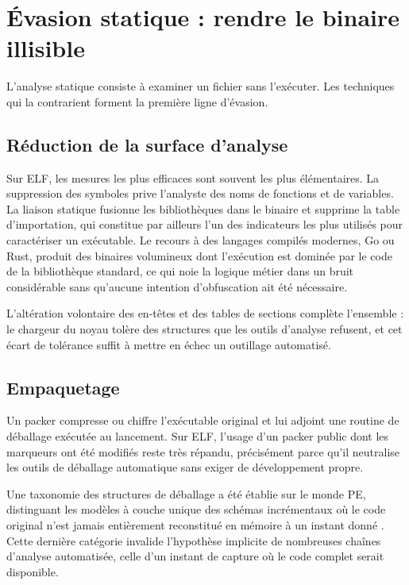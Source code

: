 \section{Évasion statique : rendre le binaire illisible}

L'analyse statique consiste à examiner un fichier sans l'exécuter. Les techniques qui la contrarient forment la première ligne d'évasion.

\subsection{Réduction de la surface d'analyse}

Sur ELF, les mesures les plus efficaces sont souvent les plus élémentaires. La suppression des symboles prive l'analyste des noms de fonctions et de variables. La liaison statique fusionne les bibliothèques dans le binaire et supprime la table d'importation, qui constitue par ailleurs l'un des indicateurs les plus utilisés pour caractériser un exécutable. Le recours à des langages compilés modernes, Go ou Rust, produit des binaires volumineux dont l'exécution est dominée par le code de la bibliothèque standard, ce qui noie la logique métier dans un bruit considérable sans qu'aucune intention d'obfuscation ait été nécessaire.

L'altération volontaire des en-têtes et des tables de sections complète l'ensemble : le chargeur du noyau tolère des structures que les outils d'analyse refusent, et cet écart de tolérance suffit à mettre en échec un outillage automatisé.

\subsection{Empaquetage}

Un packer compresse ou chiffre l'exécutable original et lui adjoint une routine de déballage exécutée au lancement. Sur ELF, l'usage d'un packer public dont les marqueurs ont été modifiés reste très répandu, précisément parce qu'il neutralise les outils de déballage automatique sans exiger de développement propre.

Une taxonomie des structures de déballage a été établie sur le monde PE, distinguant les modèles à couche unique des schémas incrémentaux où le code original n'est jamais entièrement reconstitué en mémoire à un instant donné \cite{ugartepedrero2015}. Cette dernière catégorie invalide l'hypothèse implicite de nombreuses chaînes d'analyse automatisée, celle d'un instant de capture où le code complet serait disponible.


